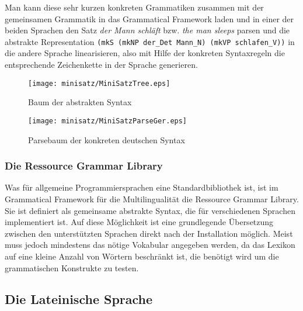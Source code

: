 \documentclass[11pt]{scrartcl}
\begin{document}
Man kann diese sehr kurzen konkreten Grammatiken zusammen mit der gemeinsamen Grammatik in das Grammatical Framework laden und in einer der beiden Sprachen den Satz \textit{der Mann schläft} bzw. \textit{the man sleeps} parsen und die abstrakte Representation \texttt{(mkS (mkNP der\_Det Mann\_N) (mkVP schlafen\_V))} in die andere Sprache linearisieren, also mit Hilfe der konkreten Syntaxregeln die entsprechende Zeichenkette in der Sprache generieren.
\begin{figure}
\texttt{[image: minisatz/MiniSatzTree.eps]}
\caption{Baum der abstrakten Syntax}\label{GF-MiniSatz-Tree}
\end{figure}
\begin{figure}
\texttt{[image: minisatz/MiniSatzParseGer.eps]}
\caption{Parsebaum der konkreten deutschen Syntax}\label{GF-MiniSatz-ParseGer}
\end{figure}
\subsubsection{Die Ressource Grammar Library}
Was für allgemeine Programmiersprachen eine Standardbibliothek ist, ist im Grammatical Framework für die Multilingualität die Ressource Grammar Library. Sie ist definiert als gemeinsame abstrakte Syntax, die für verschiedenen Sprachen implementiert ist. Auf diese Möglichkeit ist eine grundlegende Übersetzung zwischen den unterstützten Sprachen direkt nach der Installation möglich. Meist muss jedoch mindestens das nötige Vokabular angegeben werden, da das Lexikon auf eine kleine Anzahl von Wörtern beschränkt ist, die benötigt wird um die grammatischen Konstrukte zu testen. \\
\subsection{Die Lateinische Sprache}
\end{document}
